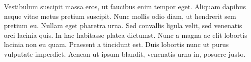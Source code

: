 \documentclass{pssbmac}
\begin{document}
Vestibulum suscipit massa eros, ut faucibus enim tempor eget. Aliquam dapibus neque vitae metus pretium suscipit. Nunc mollis odio diam, ut hendrerit sem pretium eu. Nullam eget pharetra urna. Sed convallis ligula velit, sed venenatis orci lacinia quis. In hac habitasse platea dictumst. Nunc a magna ac elit lobortis lacinia non eu quam. Praesent a tincidunt est. Duis lobortis nunc ut purus vulputate imperdiet. Aenean ut ipsum blandit, venenatis urna in, posuere justo. 

\printbibliography
\end{document}

